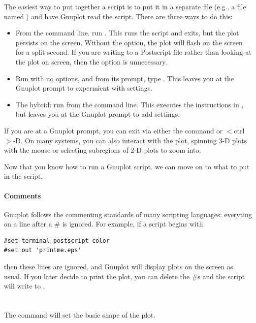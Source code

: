 The easiest way to put together a script is to put it in a separate file
(e.g., a file named ) and have Gnuplot read the script. There
are three ways to do this:
\begin{itemize}
\item From the command line, run . This runs
the script and exits, but the plot persists on the screen. Without the
 option, the plot will flash on the screen for a split
second. If you are writing to a Postscript file rather than looking at
the plot on screen, then the  option is unnecessary.
\item Run  with no options, and from its prompt, type . This leaves you at the Gnuplot prompt to expermient with settings.
\item The hybrid: run  from the command line. This
executes the instructions in , but  leaves you at the Gnuplot
prompt to add settings.
\end{itemize}

If you are at a Gnuplot prompt, you can exit via either the 
command or $<$ctrl$>$-D. On many systems, you can also interact with the plot,
spinning 3-D plots with the mouse or selecting subregions of 2-D plots
to zoom into.


Now that you know how to run a Gnuplot script, we can move on to what
to put in the script.

\paragraph{Comments} 
Gnuplot follows the commenting standards of many scripting languages:
everyting on a line after a \# is ignored. For example, if a script
begins with
\begin{lstlisting}
#set terminal postscript color
#set out 'printme.eps'
\end{lstlisting}
then these lines are ignored, and Gnuplot will display plots on the
screen as usual. If you later decide to print the plot, you can delete
the \#s and the script will write to .


\section{} The  command will set the basic shape of
the plot. 

